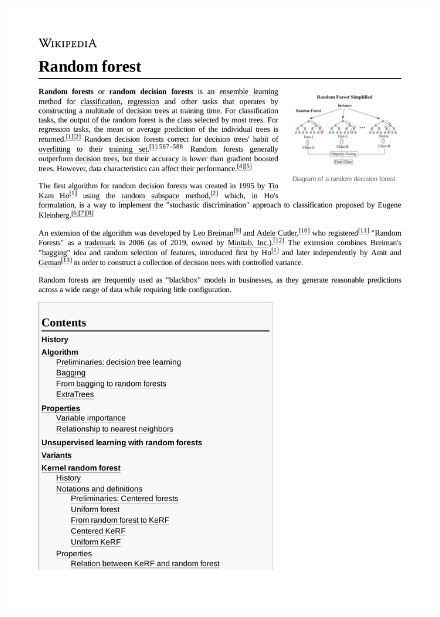 \documentclass[12pt,a4paper]{article}
\begin{document}
\begin{figure}[h]
	\includegraphics[scale=0.6]{courses/Random_forest.pdf}

\end{figure}
\end{document}
